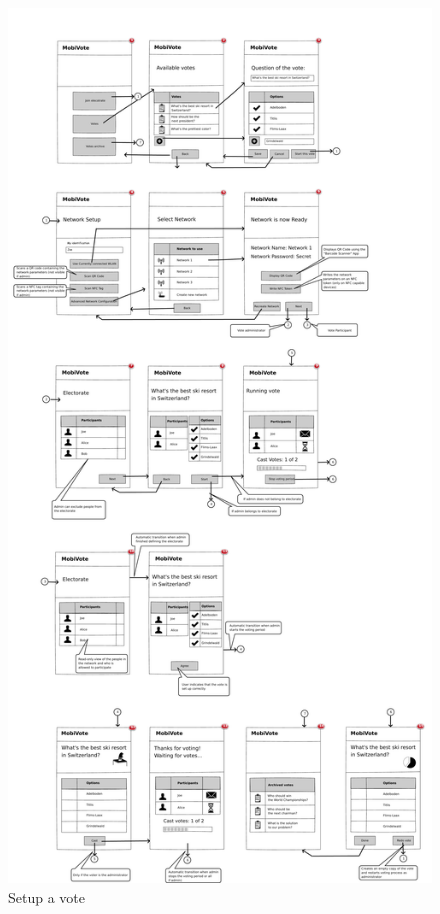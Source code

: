 \documentclass[numbers=noenddot, abstract=on, a4paper, headsepline,
footsepline, oneside, draft=off]{scrreprt}
\begin{document}
\begin{figure}[htbp]
	\centering
	\includegraphics[height=.4\textheight]{img/vote_setup}
	\caption{Setup a vote}
	\label{fig:vote_setup}
\end{figure}
\end{document}
